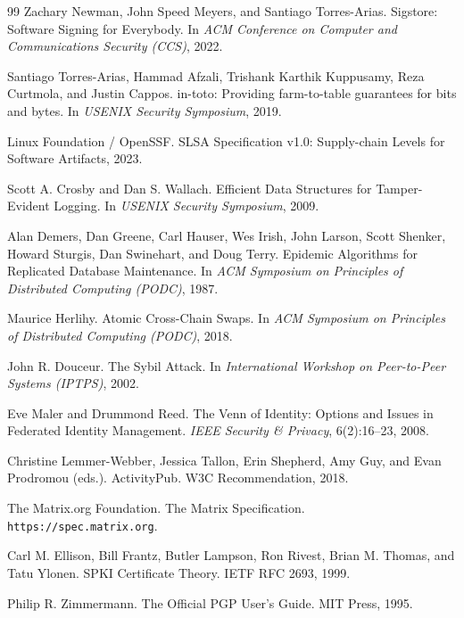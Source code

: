 \documentclass[11pt,a4paper]{article}
\theoremstyle{definition}
\theoremstyle{remark}
\begin{document}
\begin{thebibliography}{99}
Zachary Newman, John Speed Meyers, and Santiago Torres-Arias.
\newblock Sigstore: Software Signing for Everybody.
\newblock In \textit{ACM Conference on Computer and Communications Security (CCS)}, 2022.

Santiago Torres-Arias, Hammad Afzali, Trishank Karthik Kuppusamy, Reza Curtmola, and Justin Cappos.
\newblock in-toto: Providing farm-to-table guarantees for bits and bytes.
\newblock In \textit{USENIX Security Symposium}, 2019.

Linux Foundation / OpenSSF.
\newblock SLSA Specification v1.0: Supply-chain Levels for Software Artifacts, 2023.

Scott A. Crosby and Dan S. Wallach.
\newblock Efficient Data Structures for Tamper-Evident Logging.
\newblock In \textit{USENIX Security Symposium}, 2009.

Alan Demers, Dan Greene, Carl Hauser, Wes Irish, John Larson, Scott Shenker, Howard Sturgis, Dan Swinehart, and Doug Terry.
\newblock Epidemic Algorithms for Replicated Database Maintenance.
\newblock In \textit{ACM Symposium on Principles of Distributed Computing (PODC)}, 1987.

Maurice Herlihy.
\newblock Atomic Cross-Chain Swaps.
\newblock In \textit{ACM Symposium on Principles of Distributed Computing (PODC)}, 2018.

John R. Douceur.
\newblock The Sybil Attack.
\newblock In \textit{International Workshop on Peer-to-Peer Systems (IPTPS)}, 2002.

Eve Maler and Drummond Reed.
\newblock The Venn of Identity: Options and Issues in Federated Identity Management.
\newblock \textit{IEEE Security \& Privacy}, 6(2):16--23, 2008.

Christine Lemmer-Webber, Jessica Tallon, Erin Shepherd, Amy Guy, and Evan Prodromou (eds.).
\newblock ActivityPub.
\newblock W3C Recommendation, 2018.

The Matrix.org Foundation.
\newblock The Matrix Specification.
\newblock \texttt{https://spec.matrix.org}.

Carl M. Ellison, Bill Frantz, Butler Lampson, Ron Rivest, Brian M. Thomas, and Tatu Ylonen.
\newblock SPKI Certificate Theory.
\newblock IETF RFC 2693, 1999.

Philip R. Zimmermann.
\newblock The Official PGP User's Guide.
\newblock MIT Press, 1995.


\end{thebibliography}
\end{document}
